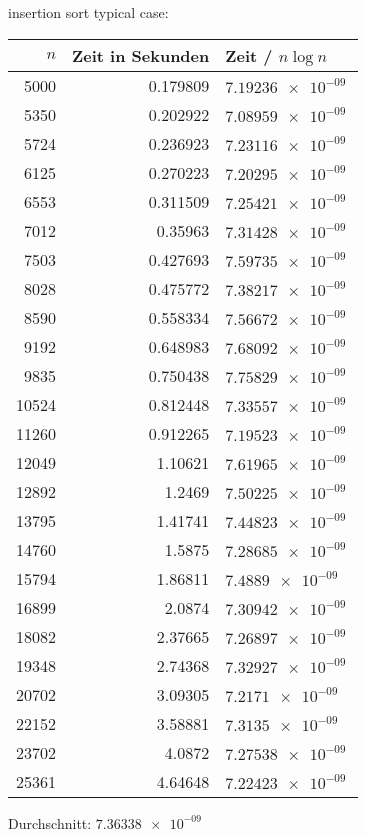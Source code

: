 \documentclass[a4paper]{scrartcl}
\begin{document}
\begin{itemize}
insertion sort typical case:
\begin{center}
\begin{tabular}{rrl}
$n$ & Zeit in Sekunden & Zeit / $n\log n$\\
\hline
5000 & 0.179809 & $\SI{7.19236e-09}{}$\\
5350 & 0.202922 & $\SI{7.08959e-09}{}$\\
5724 & 0.236923 & $\SI{7.23116e-09}{}$\\
6125 & 0.270223 & $\SI{7.20295e-09}{}$\\
6553 & 0.311509 & $\SI{7.25421e-09}{}$\\
7012 & 0.35963 & $\SI{7.31428e-09}{}$\\
7503 & 0.427693 & $\SI{7.59735e-09}{}$\\
8028 & 0.475772 & $\SI{7.38217e-09}{}$\\
8590 & 0.558334 & $\SI{7.56672e-09}{}$\\
9192 & 0.648983 & $\SI{7.68092e-09}{}$\\
9835 & 0.750438 & $\SI{7.75829e-09}{}$\\
10524 & 0.812448 & $\SI{7.33557e-09}{}$\\
11260 & 0.912265 & $\SI{7.19523e-09}{}$\\
12049 & 1.10621 & $\SI{7.61965e-09}{}$\\
12892 & 1.2469 & $\SI{7.50225e-09}{}$\\
13795 & 1.41741 & $\SI{7.44823e-09}{}$\\
14760 & 1.5875 & $\SI{7.28685e-09}{}$\\
15794 & 1.86811 & $\SI{7.4889e-09}{}$\\
16899 & 2.0874 & $\SI{7.30942e-09}{}$\\
18082 & 2.37665 & $\SI{7.26897e-09}{}$\\
19348 & 2.74368 & $\SI{7.32927e-09}{}$\\
20702 & 3.09305 & $\SI{7.2171e-09}{}$\\
22152 & 3.58881 & $\SI{7.3135e-09}{}$\\
23702 & 4.0872 & $\SI{7.27538e-09}{}$\\
25361 & 4.64648 & $\SI{7.22423e-09}{}$\\
\end{tabular}
\end{center}
Durchschnitt: $\SI{7.36338e-09}{}$


\end{itemize}
\end{document}
